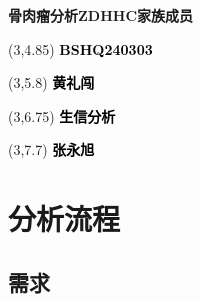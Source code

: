 \documentclass[
]{article}
\author{}
\date{\vspace{-2.5em}}
\begin{document}
\begin{titlepage} 
\begin{center} \textbf{\huge 骨肉瘤分析ZDHHC家族成员}
\vspace{4em} \begin{textblock}{10}(3,4.85) \Large
\textbf{\textcolor{black}{BSHQ240303}}
\end{textblock} \begin{textblock}{10}(3,5.8)
\Large \textbf{\textcolor{black}{黄礼闯}}
\end{textblock} \begin{textblock}{10}(3,6.75)
\Large
\textbf{\textcolor{black}{生信分析}}
\end{textblock} \begin{textblock}{10}(3,7.7)
\Large
\textbf{\textcolor{black}{张永旭}}
\end{textblock} \end{center} \end{titlepage}
\restoregeometry


\begin{center}\vspace{1.5cm}\end{center}\tableofcontents

\begin{center}\vspace{1.5cm}\end{center}\listoffigures

\begin{center}\vspace{1.5cm}\end{center}\listoftables

\newpage


\hypertarget{abstract}{%
\section{分析流程}\label{abstract}}

\hypertarget{ux9700ux6c42}{%
\subsection{需求}\label{ux9700ux6c42}}
\end{document}
